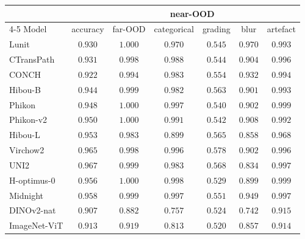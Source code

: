 \begin{tabular}{lcccccc}
\toprule
 & & & \multicolumn{2}{c}{near-OOD} & & \\
\cmidrule(lr){4-5}
Model & accuracy & far-OOD & categorical & grading & blur & artefact \\
\midrule
Lunit & $0.930$ & $1.000$ & $0.970$ & $0.545$ & $0.970$ & $0.993$ \\
CTransPath & $0.931$ & $0.998$ & $0.988$ & $0.544$ & $0.904$ & $0.996$ \\
CONCH & $0.922$ & $0.994$ & $0.983$ & $0.554$ & $0.932$ & $0.994$ \\
Hibou-B & $0.944$ & $0.999$ & $0.982$ & $0.563$ & $0.901$ & $0.993$ \\
Phikon & $0.948$ & $1.000$ & $0.997$ & $0.540$ & $0.902$ & $0.999$ \\
Phikon-v2 & $0.950$ & $1.000$ & $0.991$ & $0.542$ & $0.908$ & $0.992$ \\
Hibou-L & $0.953$ & $0.983$ & $0.899$ & $0.565$ & $0.858$ & $0.968$ \\
Virchow2 & $0.965$ & $0.998$ & $0.996$ & $0.578$ & $0.902$ & $0.996$ \\
UNI2 & $0.967$ & $0.999$ & $0.983$ & $0.568$ & $0.834$ & $0.997$ \\
H-optimus-0 & $0.956$ & $1.000$ & $0.998$ & $0.529$ & $0.899$ & $0.999$ \\
Midnight & $0.958$ & $0.999$ & $0.997$ & $0.551$ & $0.949$ & $0.997$ \\
\midrule
DINOv2-nat & $0.907$ & $0.882$ & $0.757$ & $0.524$ & $0.742$ & $0.915$ \\
ImageNet-ViT & $0.913$ & $0.919$ & $0.813$ & $0.520$ & $0.857$ & $0.914$ \\
\bottomrule
\end{tabular}
